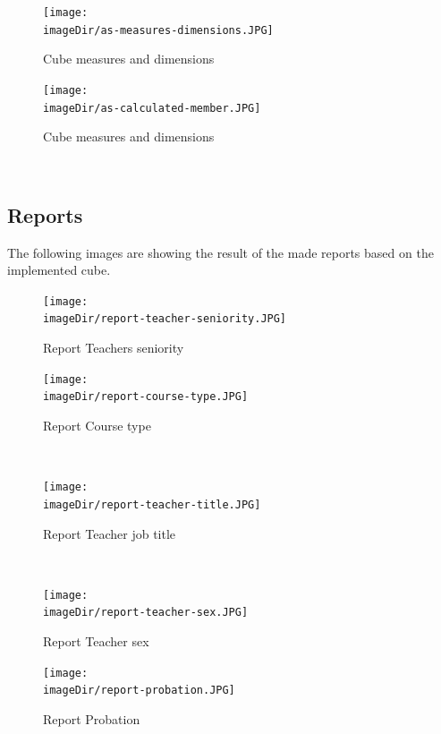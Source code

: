 \documentclass[11pt, a4paper, twoside]{article}   	%
\newcommand{\imageDir}{./images/}
\begin{document}
\begin{figure}[h]
\centering
\texttt{[image: \\imageDir/as-measures-dimensions.JPG]}
\caption{Cube measures and dimensions}
\label{fig:is-data-flow-teacher}
\end{figure}

\begin{figure}[h]
\centering
\texttt{[image: \\imageDir/as-calculated-member.JPG]}
\caption{Cube measures and dimensions}
\label{fig:is-data-flow-teacher}
\end{figure}
\ \newpage

\subsection{Reports}
The following images are showing the result of the made reports based on the implemented cube.

\begin{figure}[h]
\centering
\texttt{[image: \\imageDir/report-teacher-seniority.JPG]}
\caption{Report Teachers seniority}
\label{fig:is-data-flow-teacher}
\end{figure}

\begin{figure}[h]
\centering
\texttt{[image: \\imageDir/report-course-type.JPG]}
\caption{Report Course type}
\label{fig:is-data-flow-teacher}
\end{figure}
\ \newpage

\begin{figure}[h]
\centering
\texttt{[image: \\imageDir/report-teacher-title.JPG]}
\caption{Report Teacher job title}
\label{fig:is-data-flow-teacher}
\end{figure}
\ \newpage

\begin{figure}[h]
\centering
\texttt{[image: \\imageDir/report-teacher-sex.JPG]}
\caption{Report Teacher sex}
\label{fig:is-data-flow-teacher}
\end{figure}

\begin{figure}[h]
\centering
\texttt{[image: \\imageDir/report-probation.JPG]}
\caption{Report Probation}
\label{fig:is-data-flow-teacher}
\end{figure}
\end{document}
